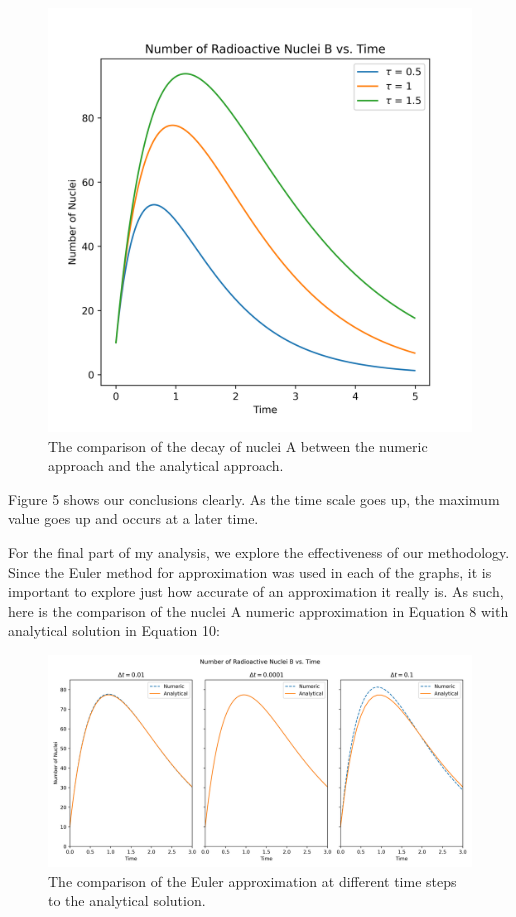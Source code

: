 \documentclass[pra,twocolumn,showpacs,amsmath,amssymb]{revtex4-2}
\begin{document}
\begin{figure}[H]
\includegraphics[scale=0.50]{Nuclei_B_0.01.png}
\caption{The comparison of the decay of nuclei A between the numeric approach and the analytical approach.}
\end{figure}

Figure 5 shows our conclusions clearly. As the time scale goes up, the maximum value goes up and occurs at a later time.

\par For the final part of my analysis, we explore the effectiveness of our methodology. Since the Euler method for approximation was used in each of the graphs, it is important to explore just how accurate of an approximation it really is. As such, here is the comparison of the nuclei A numeric approximation in Equation 8 with analytical solution in Equation 10:

\begin{figure}[H]
\includegraphics[scale=0.28]{Nuclei_AB_comp.png}
\caption{The comparison of the Euler approximation at different time steps to the analytical solution.}
\end{figure}
\end{document}
